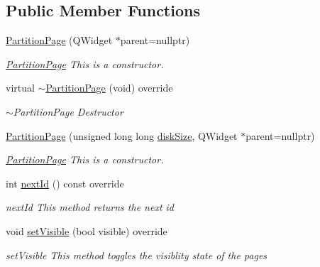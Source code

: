 \subsection*{Public Member Functions}
\begin{DoxyCompactItemize}
\item 
\mbox{\hyperlink{classui_1_1wizard_1_1pages_1_1_partition_page_a0d12fa168dd41719b3d70cb2effd3629}{Partition\+Page}} (Q\+Widget $\ast$parent=nullptr)
\begin{DoxyCompactList}\small\item\em \mbox{\hyperlink{classui_1_1wizard_1_1pages_1_1_partition_page}{Partition\+Page}} This is a constructor. \end{DoxyCompactList}\item 
virtual \mbox{\hyperlink{classui_1_1wizard_1_1pages_1_1_partition_page_ae74768e1ba91fbf4c094f73ae40ed62c}{$\sim$\+Partition\+Page}} (void) override
\begin{DoxyCompactList}\small\item\em $\sim$\+Partition\+Page Destructor \end{DoxyCompactList}\item 
\mbox{\hyperlink{classui_1_1wizard_1_1pages_1_1_partition_page_a426e777d0785c6992bcfa8a1badd242e}{Partition\+Page}} (unsigned long long \mbox{\hyperlink{classui_1_1wizard_1_1pages_1_1_partition_page_a79050f29e018d84c862fed6fe70bb91c}{disk\+Size}}, Q\+Widget $\ast$parent=nullptr)
\begin{DoxyCompactList}\small\item\em \mbox{\hyperlink{classui_1_1wizard_1_1pages_1_1_partition_page}{Partition\+Page}} This is a constructor. \end{DoxyCompactList}\item 
int \mbox{\hyperlink{classui_1_1wizard_1_1pages_1_1_partition_page_a63ae270155bc6d01ae83adf63860d6f9}{next\+Id}} () const override
\begin{DoxyCompactList}\small\item\em next\+Id This method returns the next id \end{DoxyCompactList}\item 
void \mbox{\hyperlink{classui_1_1wizard_1_1pages_1_1_partition_page_a105573c5cd7af63d8425672c45d2540f}{set\+Visible}} (bool visible) override
\begin{DoxyCompactList}\small\item\em set\+Visible This method toggles the visiblity state of the pages \end{DoxyCompactList}\end{DoxyCompactItemize}

